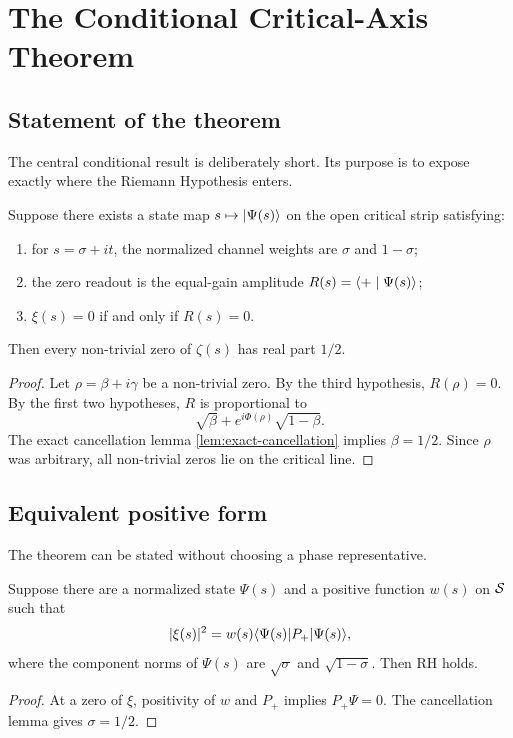 \chapter{The Conditional Critical-Axis Theorem}
\label{chap:conditional}

\section{Statement of the theorem}

The central conditional result is deliberately short. Its purpose is to expose exactly where the Riemann Hypothesis enters.

\begin{theorem}
\label{thm:conditional-rh}
Suppose there exists a state map $s\mapsto\lvert \Psi(s)\rangle$ on the open critical strip satisfying:
\begin{enumerate}
  \item for $s=\sigma+it$, the normalized channel weights are $\sigma$ and $1-\sigma$;
  \item the zero readout is the equal-gain amplitude $R(s)=\langle +\mid \Psi(s)\rangle$;
  \item $\xi(s)=0$ if and only if $R(s)=0$.
\end{enumerate}
Then every non-trivial zero of $\zeta(s)$ has real part $1/2$.
\end{theorem}
\begin{proof}
Let $\rho=\beta+i\gamma$ be a non-trivial zero. By the third hypothesis, $R(\rho)=0$. By the first two hypotheses, $R$ is proportional to
\[
 \sqrt\beta+e^{i\Phi(\rho)}\sqrt{1-\beta}.
\]
The exact cancellation lemma \cref{lem:exact-cancellation} implies $\beta=1/2$. Since $\rho$ was arbitrary, all non-trivial zeros lie on the critical line.
\end{proof}


\section{Equivalent positive form}

The theorem can be stated without choosing a phase representative.

\begin{corollary}
Suppose there are a normalized state $\Psi(s)$ and a positive function $w(s)$ on $\mathcal{S}$ such that
\begin{equation}
 |\xi(s)|^2=w(s)\langle \Psi(s)\rvert P_+\lvert \Psi(s)\rangle,
 \label{eq:conditional-positive}
\end{equation}
where the component norms of $\Psi(s)$ are $\sqrt\sigma$ and $\sqrt{1-\sigma}$. Then RH holds.
\end{corollary}
\begin{proof}
At a zero of $\xi$, positivity of $w$ and $P_+$ implies $P_+\Psi=0$. The cancellation lemma gives $\sigma=1/2$.
\end{proof}

